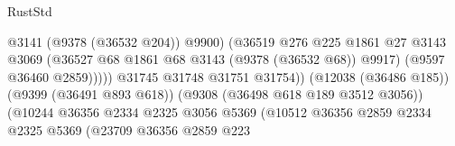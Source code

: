 \begin{lexlean}{RustStd}
\begin{coremodule}
                                                            @3141
                                                            (@9378 (@36532 @204))
                                                            @9900)
                                                          (@36519
                                                            @276
                                                            @225
                                                            @1861
                                                            @27
                                                            @3143
                                                            @3069
                                                            (@36527
                                                              @68
                                                              @1861
                                                              @68
                                                              @3143
                                                              (@9378 (@36532 @68))
                                                              @9917)
                                                            (@9597 @36460 @2859)))))
                                                    @31745
                                                    @31748
                                                    @31751
                                                    @31754))
                                                (@12038 (@36486 @185))
                                                (@9399 (@36491 @893 @618))
                                                (@9308 (@36498 @618 @189 @3512 @3056))
                                                (@10244
                                                  @36356
                                                  @2334
                                                  @2325
                                                  @3056
                                                  @5369
                                                  (@10512
                                                    @36356
                                                    @2859
                                                    @2334
                                                    @2325
                                                    @5369
                                                    (@23709
                                                      @36356
                                                      @2859
                                                      @223

\end{coremodule}
\end{lexlean}
